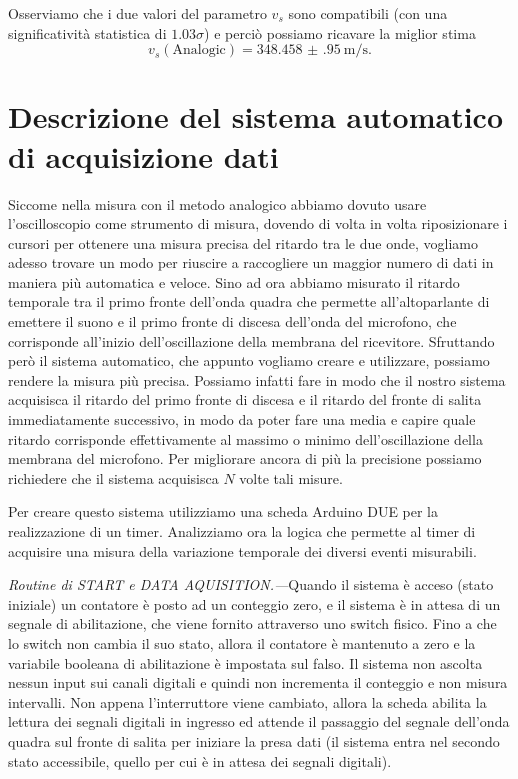 \documentclass[
    rmp,
    reprint, 
    superscriptaddress, 
    altaffilletter, 
    amsmath, 
    amssymb, 
    a4paper,
    varvw]{revtex4-2}
\begin{document}
Osserviamo che i due valori del parametro $v_s$ sono compatibili (con una significatività statistica di $1.03\sigma$) e perciò possiamo ricavare la miglior stima \[v_s(\text{Analogic})=\SI{348.458(950)}{\metre\per\second}.\]

\section{Descrizione del sistema automatico di acquisizione dati}
Siccome nella misura con il metodo analogico abbiamo dovuto usare l'oscilloscopio come strumento di misura, dovendo di volta in volta riposizionare i cursori per ottenere una misura precisa del ritardo tra le due onde, vogliamo adesso trovare un modo per riuscire a raccogliere un maggior numero di dati in maniera più automatica e veloce.
Sino ad ora abbiamo misurato il ritardo temporale tra il primo fronte dell'onda quadra che permette all'altoparlante di emettere il suono e il primo fronte di discesa dell'onda del microfono, che corrisponde all'inizio dell'oscillazione della membrana del ricevitore. Sfruttando però il sistema automatico, che appunto vogliamo creare e utilizzare, possiamo rendere la misura più precisa. Possiamo infatti fare in modo che il nostro sistema acquisisca il ritardo del primo fronte di discesa e il ritardo del fronte di salita immediatamente successivo, in modo da poter fare una media e capire quale ritardo corrisponde effettivamente al massimo o minimo dell'oscillazione della membrana del microfono. Per migliorare ancora di più la precisione possiamo richiedere che il sistema acquisisca $N$ volte tali misure.

Per creare questo sistema utilizziamo una scheda Arduino DUE per la realizzazione di un timer.  Analizziamo ora la logica che permette al timer di acquisire una misura della variazione temporale dei diversi eventi misurabili. 

\noindent\textit{Routine di \emph{START} e \emph{DATA AQUISITION}.---}Quando il sistema è acceso (stato iniziale) un contatore è posto ad un conteggio zero, e il sistema è in attesa di un segnale di abilitazione, che viene fornito attraverso uno switch fisico. Fino a che lo switch non cambia il suo stato, allora il contatore è mantenuto a zero e la variabile booleana di abilitazione è impostata sul falso. Il sistema non ascolta nessun input sui canali digitali e quindi non incrementa il conteggio e non misura intervalli. Non appena l'interruttore viene cambiato, allora la scheda abilita la lettura dei segnali digitali in ingresso ed attende il passaggio del segnale dell'onda quadra sul fronte di salita per iniziare la presa dati (il sistema entra nel secondo stato accessibile, quello per cui è in attesa dei segnali digitali).
\end{document}

